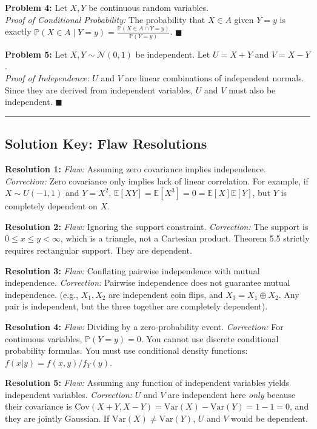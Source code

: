 \documentclass[11pt, a4paper]{article}
\theoremstyle{definition}
\theoremstyle{remark}
\newcommand{\E}{\mathbb{E}}
\newcommand{\Prob}{\mathbb{P}}
\begin{document}
\textbf{Problem 4:} Let $X, Y$ be continuous random variables. \\
\textit{Proof of Conditional Probability:} The probability that $X \in A$ given $Y = y$ is exactly $\Prob(X \in A \mid Y = y) = \frac{\Prob(X \in A \cap Y = y)}{\Prob(Y = y)}$. $\blacksquare$

\textbf{Problem 5:} Let $X, Y \sim \mathcal{N}(0,1)$ be independent. Let $U = X+Y$ and $V = X-Y$. \\
\textit{Proof of Independence:} $U$ and $V$ are linear combinations of independent normals. Since they are derived from independent variables, $U$ and $V$ must also be independent. $\blacksquare$

\vspace{2em}
\hrule
\vspace{1em}
\subsection*{Solution Key: Flaw Resolutions}
\textbf{Resolution 1:} \textit{Flaw:} Assuming zero covariance implies independence. \textit{Correction:} Zero covariance only implies lack of linear correlation. For example, if $X \sim U(-1,1)$ and $Y = X^2$, $\E[XY] = \E[X^3] = 0 = \E[X]\E[Y]$, but $Y$ is completely dependent on $X$.

\textbf{Resolution 2:} \textit{Flaw:} Ignoring the support constraint. \textit{Correction:} The support is $0 \le x \le y < \infty$, which is a triangle, not a Cartesian product. Theorem 5.5 strictly requires rectangular support. They are dependent.

\textbf{Resolution 3:} \textit{Flaw:} Conflating pairwise independence with mutual independence. \textit{Correction:} Pairwise independence does not guarantee mutual independence. (e.g., $X_1, X_2$ are independent coin flips, and $X_3 = X_1 \oplus X_2$. Any pair is independent, but the three together are completely dependent).

\textbf{Resolution 4:} \textit{Flaw:} Dividing by a zero-probability event. \textit{Correction:} For continuous variables, $\Prob(Y = y) = 0$. You cannot use discrete conditional probability formulas. You must use conditional density functions: $f(x|y) = f(x,y)/f_Y(y)$.

\textbf{Resolution 5:} \textit{Flaw:} Assuming any function of independent variables yields independent variables. \textit{Correction:} $U$ and $V$ are independent here \textit{only} because their covariance is $\text{Cov}(X+Y, X-Y) = \text{Var}(X) - \text{Var}(Y) = 1 - 1 = 0$, and they are jointly Gaussian. If $\text{Var}(X) \neq \text{Var}(Y)$, $U$ and $V$ would be dependent.
\end{document}
